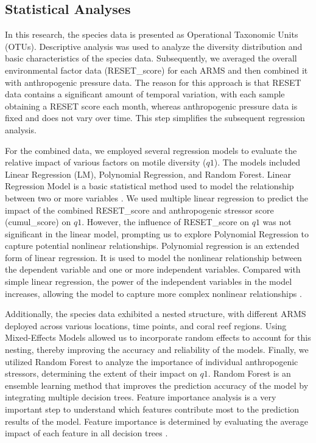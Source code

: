\documentclass[a4paper, 11]{article}
\begin{document}
\subsection{Statistical Analyses}

In this research, the species data is presented as Operational Taxonomic Units (OTUs). Descriptive analysis was used to analyze the diversity distribution and basic characteristics of the species data. Subsequently, we averaged the overall environmental factor data (RESET\_score) for each ARMS and then combined it with anthropogenic pressure data. The reason for this approach is that RESET data contains a significant amount of temporal variation, with each sample obtaining a RESET score each month, whereas anthropogenic pressure data is fixed and does not vary over time. This step simplifies the subsequent regression analysis. 

For the combined data, we employed several regression models to evaluate the relative impact of various factors on motile diversity (\( q1 \)). The models included Linear Regression (LM), Polynomial Regression, and Random Forest. Linear Regression Model is a basic statistical method used to model the relationship between two or more variables \citep{montgomery2021introduction}. We used multiple linear regression to predict the impact of the combined RESET\_score and anthropogenic stressor score (cumul\_score) on \( q1 \). However, the influence of RESET\_score on \( q1 \) was not significant in the linear model, prompting us to explore Polynomial Regression to capture potential nonlinear relationships. Polynomial regression is an extended form of linear regression. It is used to model the nonlinear relationship between the dependent variable and one or more independent variables. Compared with simple linear regression, the power of the independent variables in the model increases, allowing the model to capture more complex nonlinear relationships \citep{seber2012linear}.

Additionally, the species data exhibited a nested structure, with different ARMS deployed across various locations, time points, and coral reef regions. Using Mixed-Effects Models allowed us to incorporate random effects to account for this nesting, thereby improving the accuracy and reliability of the models. Finally, we utilized Random Forest to analyze the importance of individual anthropogenic stressors, determining the extent of their impact on \( q1 \). Random Forest is an ensemble learning method that improves the prediction accuracy of the model by integrating multiple decision trees. Feature importance analysis is a very important step to understand which features contribute most to the prediction results of the model. Feature importance is determined by evaluating the average impact of each feature in all decision trees \citep{breiman2001random}.\\
\end{document}

